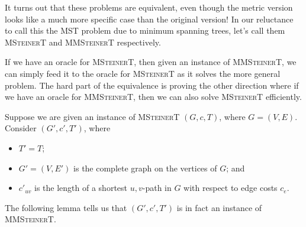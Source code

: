 It turns out that these problems are equivalent, even though the metric 
version looks like a much more specific case than the original version! 
In our reluctance to call this the \textsc{MST} problem due to minimum 
spanning trees, let's call them \textsc{MSteinerT} and \textsc{MMSteinerT}
respectively. 

If we have an oracle for \textsc{MSteinerT}, then given an instance of 
\textsc{MMSteinerT}, we can simply feed it to the oracle for \textsc{MSteinerT}
as it solves the more general problem. The hard part of the equivalence 
is proving the other direction where if we have an oracle for 
\textsc{MMSteinerT}, then we can also solve \textsc{MSteinerT} efficiently.

Suppose we are given an instance of \textsc{MSteinerT} $(G, c, T)$, 
where $G = (V, E)$. Consider $(G', c', T')$, where
\begin{itemize}
    \item $T' = T$;
    \item $G' = (V, E')$ is the complete graph on the vertices of $G$; and 
    \item $c'_{uv}$ is the length of a shortest $u,v$-path in $G$ with 
    respect to edge costs $c_e$.
\end{itemize}
The following lemma tells us that $(G', c', T')$ is in fact an instance of 
\textsc{MMSteinerT}.

